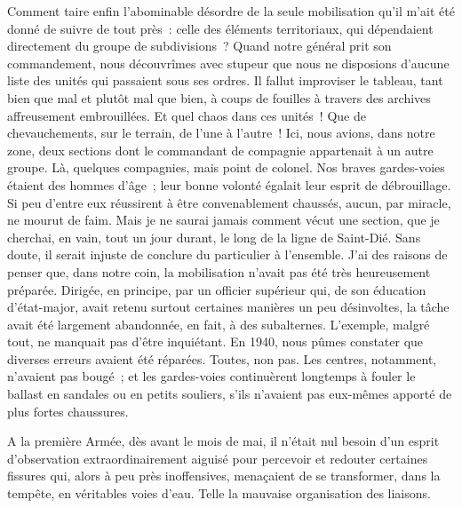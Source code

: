 \documentclass[french,twoside]{book} %
\begin{document}
Comment taire enfin l’abominable désordre de la seule mobilisation qu’il m’ait été donné de suivre de tout près : celle des éléments territoriaux, qui dépendaient directement du groupe de subdivisions ? Quand notre général prit son commandement, nous découvrîmes avec stupeur que nous ne disposions d’aucune liste des unités qui passaient sous ses ordres. Il fallut improviser le tableau, tant bien que mal et plutôt mal que bien, à coups de fouilles à travers des archives affreusement embrouillées. Et quel chaos dans ces unités ! Que de chevauchements, sur le terrain, de l’une à l’autre ! Ici, nous avions, dans notre zone, deux sections dont le commandant de compagnie appartenait à un autre groupe. Là, quelques compagnies, mais point de colonel. Nos braves gardes-voies étaient des hommes d’âge ; leur bonne volonté égalait leur esprit de débrouillage. Si peu d’entre eux réussirent à être convenablement chaussés, aucun, par miracle, ne mourut de faim. Mais je ne saurai jamais comment vécut une section, que je cherchai, en vain, tout un jour durant, le long de la ligne de Saint-Dié. Sans doute, il serait injuste   de conclure du particulier à l’ensemble. J’ai des raisons de penser que, dans notre coin, la mobilisation n’avait pas été très heureusement préparée. Dirigée, en principe, par un officier supérieur qui, de son éducation d’état-major, avait retenu surtout certaines manières un peu désinvoltes, la tâche avait été largement abandonnée, en fait, à des subalternes. L’exemple, malgré tout, ne manquait pas d’être inquiétant. En 1940, nous pûmes constater que diverses erreurs avaient été réparées. Toutes, non pas. Les centres, notamment, n’avaient pas bougé ; et les gardes-voies continuèrent longtemps à fouler le ballast en sandales ou en petits souliers, s’ils n’avaient pas eux-mêmes apporté de plus fortes chaussures.\par
A la première Armée, dès avant le mois de mai, il n’était nul besoin d’un esprit d’observation extraordinairement aiguisé pour percevoir et redouter certaines fissures qui, alors à peu près inoffensives, menaçaient de se transformer, dans la tempête, en véritables voies d’eau. Telle la mauvaise organisation des liaisons.\par
\end{document}
